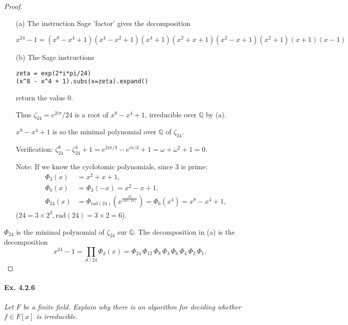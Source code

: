 \documentclass[11pt,a4paper]{article}
\begin{document}
\begin{proof}
\begin{enumerate}
\item[(a)] The instruction Sage  'factor' gives the decomposition

$x^{24}-1 = (x^8 - x^4 + 1)(x^4 - x^2 + 1)(x^4 + 1)(x^2 + x + 1)(x^2 - x +
1)(x^2 + 1)(x + 1)(x - 1)$


\item[(b)]
The Sage instructions
\begin{verbatim}
zeta = exp(2*i*pi/24)
(x^8 - x^4 + 1).subs(x=zeta).expand()
\end{verbatim}
return the value 0.

Thus $\zeta _{24} = e^{2i \pi}/24$ is a root of $x^8-x^{4}+1$, irreducible over $\mathbb{Q}$ by (a).

$x^8 - x^4+1$ is so the minimal polynomial over $\mathbb{Q}$ of $\zeta_{24}$.

Verification: $\zeta_{24}^8 - \zeta_{24}^4+1 = e^{2i\pi/3}-e^{i\pi/3}+1 = \omega+\omega^2+1 = 0$.


Note: If we know the cyclotomic polynomials, since $3$ is prime:
\begin{align*}
\Phi_3(x) &= x^2+x+1,\\
\Phi_6(x) &= \Phi_3(-x) = x^2-x+1,\\
\Phi_{24}(x) &= \Phi_{\mathrm{rad}(24)} (x^{\frac{24}{\mathrm{rad}(24)}}) = \Phi_6(x^4) = x^8 - x^4+1,
\end{align*}
($24 = 3\times2^3, \mathrm{rad}(24) = 3\times 2 = 6$).
\end{enumerate}
$\Phi_{24}$ is the minimal polynomial of $\zeta_{24}$ sur $\mathbb{Q}$.
The decomposition in (a) is the decomposition
$$x^{24}-1 =\prod_{d\mid 24 }  \Phi_d(x) = \Phi_{24} \,\Phi_{12} \,\Phi_{8} \,\Phi_{3}\, \Phi_{6} \,\Phi_{4} \,\Phi_{2}\, \Phi_{1}.$$
\end{proof}

\paragraph{Ex. 4.2.6}

{\it Let $F$ be a finite field. Explain why there is an algorithm for deciding whether $f \in F[x]$ is irreducible.
}
\end{document}
